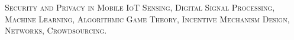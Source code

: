 \vspace{-.1in}

\begin{cvparagraph}
	\scshape
	Security and Privacy in Mobile IoT Sensing,
	Digital Signal Processing,
	Machine Learning,
	Algorithmic Game Theory,
	Incentive Mechanism Design,
	Networks,
	Crowdsourcing.
\end{cvparagraph}

%	
%	
%	
%	
%	
